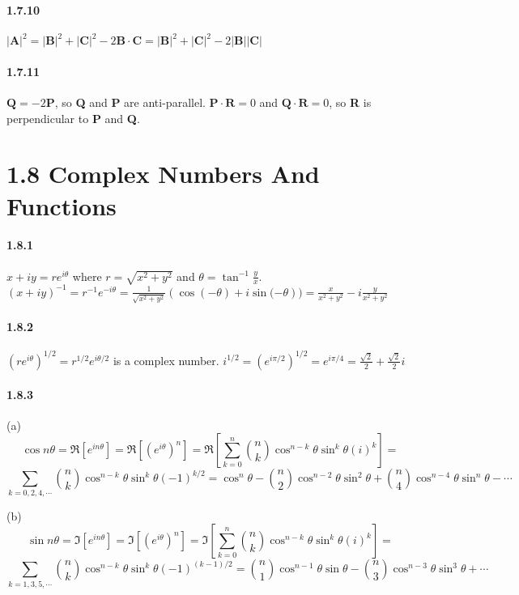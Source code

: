 \documentclass[a4paper]{article}
\begin{document}
\paragraph{1.7.10}
$|\mathbf{A}|^2=|\mathbf{B}|^2+|\mathbf{C}|^2-2\mathbf{B}\cdot\mathbf{C}=|\mathbf{B}|^2+|\mathbf{C}|^2-2|\mathbf{B}||\mathbf{C}|$

\paragraph{1.7.11}
$\mathbf{Q}=-2\mathbf{P}$, so \textbf{Q} and \textbf{P} are anti-parallel. $\mathbf{P}\cdot\mathbf{R}=0$ and $\mathbf{Q}\cdot\mathbf{R}=0$, so \textbf{R} is perpendicular to \textbf{P} and \textbf{Q}.

\section*{1.8 Complex Numbers And Functions}

\paragraph{1.8.1}
$x+iy=re^{i\theta}$ where $r=\sqrt{x^2+y^2}$ and  $\theta=\tan^{-1}\frac{y}{x}$. $(x+iy)^{-1}=r^{-1}e^{-i\theta}=\frac{1}{\sqrt{x^2+y^2}}(\cos{(-\theta)}+i\sin{(-\theta}))=\frac{x}{x^2+y^2}-i\frac{y}{x^2+y^2}$

\paragraph{1.8.2}
$(re^{i\theta})^{1/2}=r^{1/2}e^{i\theta/2}$ is a complex number. $i^{1/2}=(e^{i\pi/2})^{1/2}=e^{i\pi/4}=\frac{\sqrt{2}}{2}+\frac{\sqrt{2}}{2}i$

\paragraph{1.8.3}
(a)
\[\cos{n\theta}=\Re{\left[e^{in\theta}\right]}=\Re{\left[(e^{i\theta})^n\right]}=\Re{\left[\sum_{k=0}^n\binom{n}{k}\cos^{n-k}\theta\sin^k\theta(i)^k\right]}=\]
\[\sum_{k=0,2,4,\cdots}\binom{n}{k}\cos^{n-k}\theta\sin^k\theta(-1)^{k/2}
=\cos^n\theta-\binom{n}{2}\cos^{n-2}\theta\sin^2\theta+\binom{n}{4}\cos^{n-4}\theta\sin^{n}\theta-\cdots\]

(b)
\[\sin{n\theta}=\Im{\left[e^{in\theta}\right]}=\Im{\left[(e^{i\theta})^n\right]}=\Im{\left[\sum_{k=0}^n\binom{n}{k}\cos^{n-k}\theta\sin^k\theta(i)^k\right]}=\]
\[\sum_{k=1,3,5,\cdots}\binom{n}{k}\cos^{n-k}\theta\sin^k\theta(-1)^{(k-1)/2}
=\binom{n}{1}\cos^{n-1}\theta\sin\theta-\binom{n}{3}\cos^{n-3}\theta\sin^3\theta+\cdots\]
\end{document}

